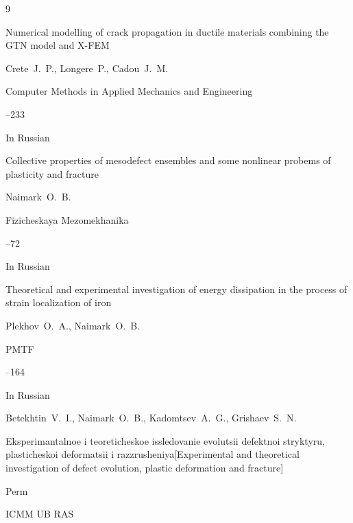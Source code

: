 \begin{thebibliography}{9}

\paper Numerical modelling of crack propagation in ductile materials combining the GTN model and X-FEM

\by Crete~J.~P., Longere~P., Cadou~J.~M.

\jour Computer Methods in Applied Mechanics and Engineering



--233




\lang In Russian

\paper Collective properties of mesodefect ensembles and some nonlinear probems of plasticity and fracture

\by Naimark~O.~B.

\jour Fizicheskaya Mezomekhanika



--72




\lang In Russian

\paper Theoretical and experimental investigation of energy dissipation in the process of strain localization of iron

\by Plekhov~O.~A., Naimark~O.~B.

\jour PMTF



--164




\lang In Russian

\by Betekhtin~V.~I., Naimark~O.~B., Kadomtsev~A.~G., Grishaev~S.~N.

\book Eksperimantalnoe i teoreticheskoe issledovanie evolutsii defektnoi stryktyru, plasticheskoi deformatsii i razzrusheniya[Experimental and theoretical investigation of defect evolution, plastic deformation and fracture]

\publaddr Perm

\publ ICMM UB RAS







\end{thebibliography}

